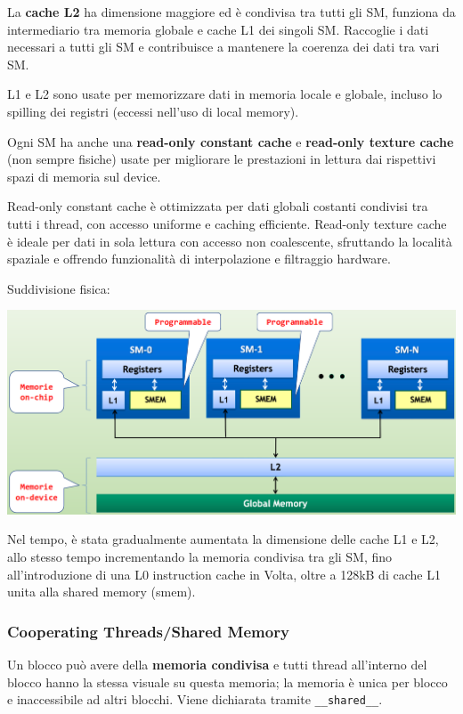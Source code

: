 La \textbf{cache L2} ha dimensione maggiore ed è condivisa tra tutti gli SM, funziona da intermediario tra memoria globale e cache L1 dei singoli SM. Raccoglie i dati necessari a tutti gli SM e contribuisce a mantenere la coerenza dei dati tra vari SM.

L1 e L2 sono usate per memorizzare dati in memoria locale e globale, incluso lo spilling dei registri (eccessi nell'uso di local memory).

Ogni SM ha anche una \textbf{read-only constant cache} e \textbf{read-only texture cache} (non sempre fisiche) usate per migliorare le prestazioni in lettura dai rispettivi spazi di memoria sul device.

Read-only constant cache è ottimizzata per dati globali costanti condivisi tra tutti i thread, con accesso uniforme e caching efficiente. Read-only texture cache è ideale per dati in sola lettura con accesso non coalescente, sfruttando la località spaziale e offrendo funzionalità di interpolazione e filtraggio hardware.

Suddivisione fisica:
\begin{center}
	\includegraphics[width=0.85\linewidth]{img/cuda/mem1}
\end{center}

Nel tempo, è stata gradualmente aumentata la dimensione delle cache L1 e L2, allo stesso tempo incrementando la memoria condivisa tra gli SM, fino all'introduzione di una L0 instruction cache in Volta, oltre a 128kB di cache L1 unita alla shared memory (smem).

\subsubsection{Cooperating Threads/Shared Memory}

Un blocco può avere della \textbf{memoria condivisa} e tutti thread all'interno del blocco hanno la stessa visuale su questa memoria; la memoria è unica per blocco e inaccessibile ad altri blocchi. Viene dichiarata tramite \texttt{\_\_shared\_\_}.

